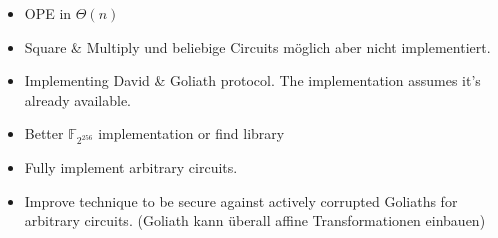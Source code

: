 
\begin{JWtodoBox}

  \begin{itemize}

    \item OPE in $\Theta(n)$

    \item Square \& Multiply und beliebige Circuits möglich aber nicht
      implementiert.

  \end{itemize}

\end{JWtodoBox}



\begin{JWtodoBox}

  \begin{itemize}

    \item Implementing David \& Goliath protocol. The implementation assumes
      it's already available.

    \item Better $\mathbb{F}_{2^{256}}$ implementation or find library

    \item Fully implement arbitrary circuits.

    \item Improve technique to be secure against actively corrupted Goliaths for
      arbitrary circuits. (Goliath kann überall affine Transformationen
      einbauen)

  \end{itemize}

\end{JWtodoBox}

